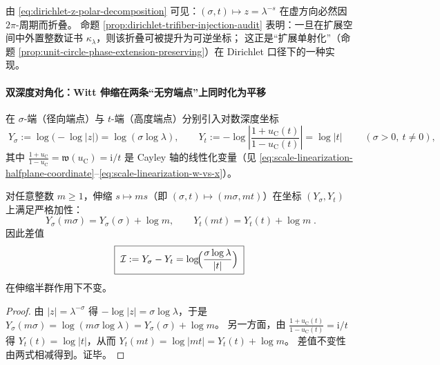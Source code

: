 \begin{remark}
由 \eqref{eq:dirichlet-z-polar-decomposition} 可见：\((\sigma,t)\mapsto z=\lambda^{-s}\) 在虚方向必然因 \(2\pi\)-周期而折叠。
命题 \ref{prop:dirichlet-trifiber-injection-audit} 表明：一旦在扩展空间中外置整数证书 \(\kappa_{\lambda}\)，则该折叠可被提升为可逆坐标；
这正是“扩展单射化”（命题 \ref{prop:unit-circle-phase-extension-preserving}）在 Dirichlet 口径下的一种实现。
\end{remark}

\paragraph{双深度对角化：Witt 伸缩在两条“无穷端点”上同时化为平移}
在 \(\sigma\)-端（径向端点）与 \(t\)-端（高度端点）分别引入对数深度坐标
\begin{equation}\label{eq:dirichlet-double-depth-coordinates}
\boxed{\;
Y_{\sigma}:=\log\!\bigl(-\log|z|\bigr)=\log(\sigma\log\lambda),
\qquad
Y_{t}:=-\log\left|\frac{1+u_{\mathrm C}(t)}{1-u_{\mathrm C}(t)}\right|=\log|t|\; }
\qquad(\sigma>0,\ t\neq 0),
\end{equation}
其中 \(\frac{1+u_{\mathrm C}}{1-u_{\mathrm C}}=\mathfrak{w}(u_{\mathrm C})=\mathrm{i}/t\) 是 Cayley 轴的线性化变量（见 \eqref{eq:scale-linearization-halfplane-coordinate}--\eqref{eq:scale-linearization-w-vs-x}）。

\begin{theorem}[双深度平移律与射线不变量]\label{thm:dirichlet-double-depth-translation}
对任意整数 \(m\ge 1\)，伸缩 \(s\mapsto ms\)（即 \((\sigma,t)\mapsto(m\sigma,mt)\)）在坐标 \((Y_{\sigma},Y_{t})\) 上满足严格加性：
\begin{equation}\label{eq:dirichlet-double-depth-translation}
\boxed{\;
Y_{\sigma}(m\sigma)=Y_{\sigma}(\sigma)+\log m,
\qquad
Y_{t}(mt)=Y_{t}(t)+\log m\; }.
\end{equation}
因此差值
\begin{equation}\label{eq:dirichlet-ray-invariant}
\boxed{\;\mathcal{I}:=Y_{\sigma}-Y_{t}=\log\!\Bigl(\frac{\sigma\log\lambda}{|t|}\Bigr)\;}
\end{equation}
在伸缩半群作用下不变。
\end{theorem}
\begin{proof}
由 \(|z|=\lambda^{-\sigma}\) 得 \(-\log|z|=\sigma\log\lambda\)，于是
\(
Y_{\sigma}(m\sigma)=\log(m\sigma\log\lambda)=Y_{\sigma}(\sigma)+\log m
\)。
另一方面，由 \(\frac{1+u_{\mathrm C}(t)}{1-u_{\mathrm C}(t)}=\mathrm{i}/t\) 得 \(Y_t(t)=\log|t|\)，从而
\(
Y_{t}(mt)=\log|mt|=Y_{t}(t)+\log m
\)。
差值不变性由两式相减得到。证毕。
\end{proof}

